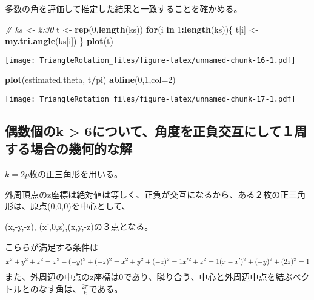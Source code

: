 \documentclass[]{article}
\newenvironment{Shaded}{\begin{snugshade}}{\end{snugshade}}
\newcommand{\KeywordTok}[1]{\textcolor[rgb]{0.13,0.29,0.53}{\textbf{#1}}}
\newcommand{\DataTypeTok}[1]{\textcolor[rgb]{0.13,0.29,0.53}{#1}}
\newcommand{\DecValTok}[1]{\textcolor[rgb]{0.00,0.00,0.81}{#1}}
\newcommand{\StringTok}[1]{\textcolor[rgb]{0.31,0.60,0.02}{#1}}
\newcommand{\CommentTok}[1]{\textcolor[rgb]{0.56,0.35,0.01}{\textit{#1}}}
\newcommand{\ControlFlowTok}[1]{\textcolor[rgb]{0.13,0.29,0.53}{\textbf{#1}}}
\newcommand{\OperatorTok}[1]{\textcolor[rgb]{0.81,0.36,0.00}{\textbf{#1}}}
\newcommand{\NormalTok}[1]{#1}
\begin{document}
多数の角を評価して推定した結果と一致することを確かめる。

\begin{Shaded}
\begin{Highlighting}[]
\CommentTok{# ks <- 2:30}
\NormalTok{t <-}\StringTok{ }\KeywordTok{rep}\NormalTok{(}\DecValTok{0}\NormalTok{,}\KeywordTok{length}\NormalTok{(ks))}
\ControlFlowTok{for}\NormalTok{(i }\ControlFlowTok{in} \DecValTok{1}\OperatorTok{:}\KeywordTok{length}\NormalTok{(ks))\{}
\NormalTok{  t[i] <-}\StringTok{ }\KeywordTok{my.tri.angle}\NormalTok{(ks[i])}
\NormalTok{\}}
\KeywordTok{plot}\NormalTok{(t)}
\end{Highlighting}
\end{Shaded}

\texttt{[image: TriangleRotation\_files/figure-latex/unnamed-chunk-16-1.pdf]}

\begin{Shaded}
\begin{Highlighting}[]
\KeywordTok{plot}\NormalTok{(estimated.theta, t}\OperatorTok{/}\NormalTok{pi)}
\KeywordTok{abline}\NormalTok{(}\DecValTok{0}\NormalTok{,}\DecValTok{1}\NormalTok{,}\DataTypeTok{col=}\DecValTok{2}\NormalTok{)}
\end{Highlighting}
\end{Shaded}

\texttt{[image: TriangleRotation\_files/figure-latex/unnamed-chunk-17-1.pdf]}

\subsection{偶数個のk \textgreater{}
6について、角度を正負交互にして１周する場合の幾何的な解}\label{ux5076ux6570ux500bux306ek-6ux306bux3064ux3044ux3066ux89d2ux5ea6ux3092ux6b63ux8ca0ux4ea4ux4e92ux306bux3057ux3066ux5468ux3059ux308bux5834ux5408ux306eux5e7eux4f55ux7684ux306aux89e3}

\(k = 2p\)枚の正三角形を用いる。

外周頂点のz座標は絶対値は等しく、正負が交互になるから、ある２枚の正三角形は、原点(0,0,0)を中心として、

(x,-y,-z), (x',0,z),(x,y,-z)の３点となる。

こららが満足する条件は \[
x^2 + y^2 + z^2 = x^2 + (-y)^2 + (-z)^2 = x^2 + y^2 + (-z)^2 = 1\\
x'^2 + z^2 = 1\\
(x-x')^2 + (-y)^2 + (2z)^2 = 1\\
\]
また、外周辺の中点のz座標は0であり、隣り合う、中心と外周辺中点を結ぶベクトルとのなす角は、\(\frac{2\pi}{k}\)である。
\end{document}
